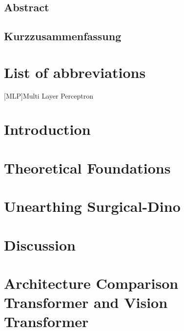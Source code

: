 \documentclass[12pt, twoside]{report_bachelorarbeit}
\renewcommand{\headrulewidth}{0.4pt}%
\renewcommand{\footrulewidth}{0.4pt}%
\renewcommand{\headrulewidth}{0.4pt}
\renewcommand{\footrulewidth}{0.4pt}
\begin{document}
\pagestyle{plain}

\section*{Abstract}

\newpage
\section*{Kurzzusammenfassung}

\newpage
%


\tableofcontents
\listoffigures
\listoftables

\chapter*{List of abbreviations}
\begin{acronym}
[MLP]{Multi Layer Perceptron}
\end{acronym}

\pagestyle{fancy}
\setlength{\headheight}{14.5pt}
\fancyhead{}
\fancyfoot{}
\fancyfoot[LE,RO]{\thepage}
\renewcommand{\headrulewidth}{0.4pt}
\renewcommand{\footrulewidth}{0.4pt}

\chapter{Introduction}
\setcounter{page}{1}

\chapter{Theoretical Foundations}

\chapter{Unearthing Surgical-Dino}

\chapter{Discussion}

% 
\clearpage
\pagestyle{plain}
\printbibliography

\appendix
\chapter{Architecture Comparison Transformer and Vision Transformer}\label{app:CompViT}


\newpage
%
\end{document}
